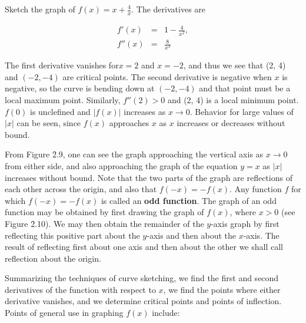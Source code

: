 \begin{example} Sketch the graph of $f(x) = x + \frac{4}{x}$. The derivatives are 

\begin{eqnarray*}
f'(x) &=& 1- \frac{4}{x^2},\\
f''(x) &=& \frac{8}{x^3}
\end{eqnarray*}

\noindent The first derivative vanishes for$x = 2$ and $x = -2$, and thus we see that (2, 4) and $(-2, -4)$ are critical points. The second derivative is negative when $x$ is negative, so the curve is bending down at $(-2, -4)$ and that point must be a local maximum point. Similarly, $f''(2) > 0$ and (2, 4) is a local minimum point. $f(0)$ is unclefined and $|f(x)|$ increases as $x \rightarrow 0$. Behavior for large values of $|x|$ can be seen, since $f(x)$ approaches $x$ as $x$ increases or decreases without bound.


From Figure \f{2.9}, one can see the graph approaching the vertical axis as $x \rightarrow 0$ from either side, and also approaching the graph of the equation $y = x$ as $|x|$ increases without bound. Note that the two parts of the graph are reflections of each other across the origin, and also that $f(-x) = -f(x)$. Any function $f$ for which $f(-x) = -f(x)$ is called an \textbf{odd function}.  The graph of an odd function may be obtained by first drawing the graph of $f(x)$, where $x > 0$ (see Figure \f{2.10}). We may then obtain the remainder of the $y$-axis graph by first reflecting this positive part about the $y$-axis and then about the $x$-axis. The result of reflecting first about one axis and then about the other we shall call reflection about the origin.
\end{example}


Summarizing the techniques of curve sketching, we find the first and second derivatives of the function with respect to $x$, we find the points where either derivative vanishes, and we determine critical points and points of inflection. Points of general use in graphing $f(x)$ include:
\smallskip

